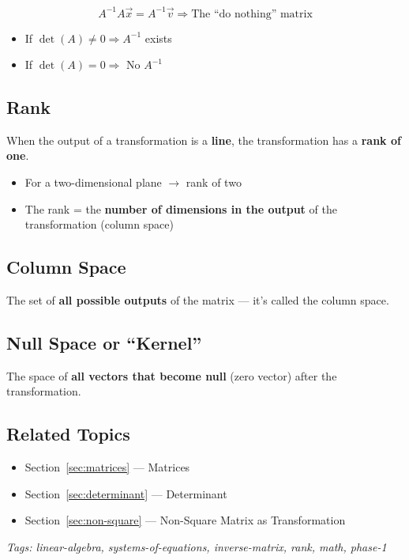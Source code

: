 \[
A^{-1}A\vec{x} = A^{-1}\vec{v} \Rightarrow \text{The ``do nothing'' matrix}
\]

\begin{itemize}[nosep]
  \item If $\det(A) \neq 0 \Rightarrow A^{-1}$ exists
  \item If $\det(A) = 0 \Rightarrow$ No $A^{-1}$
\end{itemize}

\subsection{Rank}

\begin{defbox}
When the output of a transformation is a \textbf{line}, the transformation has a \textbf{rank of one}.
\end{defbox}

\begin{itemize}[nosep]
  \item For a two-dimensional plane $\rightarrow$ rank of two
  \item The rank = the \textbf{number of dimensions in the output} of the transformation (column space)
\end{itemize}

\subsection{Column Space}

\begin{defbox}
The set of \textbf{all possible outputs} of the matrix --- it's called the column space.
\end{defbox}

\subsection{Null Space or ``Kernel''}

\begin{defbox}
The space of \textbf{all vectors that become null} (zero vector) after the transformation.
\end{defbox}

\subsection*{Related Topics}
\begin{itemize}[nosep]
  \item Section~\ref{sec:matrices} --- Matrices
  \item Section~\ref{sec:determinant} --- Determinant
  \item Section~\ref{sec:non-square} --- Non-Square Matrix as Transformation
\end{itemize}

\bigskip
\noindent\textit{Tags: linear-algebra, systems-of-equations, inverse-matrix, rank, math, phase-1}
